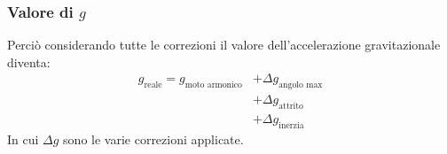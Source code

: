 \subsubsection*{Valore di \texorpdfstring{$g$}{g}}
Perciò considerando tutte le correzioni il valore dell'accelerazione gravitazionale diventa:
\begin{align*}
g_\text{reale} = g_\text{moto armonico} 
&+\Delta g_\text{angolo max} \\
&+ \Delta g_\text{attrito} \\
&+ \Delta g_\text{inerzia}
\end{align*}
In cui $\Delta g$ sono le varie correzioni applicate.\\